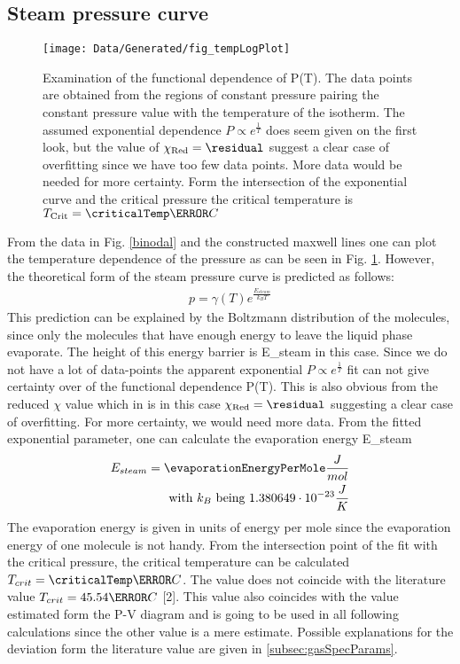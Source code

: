 \documentclass[a4paper,10pt,twocolumn]{article}
\begin{document}
    \subsection{Steam pressure curve}\label{subsec:steamPressureCurve}
    \begin{figure}
        \begin{center}
            \texttt{[image: Data/Generated/fig\_tempLogPlot]}
            \caption[]{Examination of the functional dependence of P(T). The data points are obtained from the regions of constant pressure pairing the constant pressure value with the temperature of the isotherm.
            The assumed exponential dependence $P \propto e^{\frac{1}{T}} $ does seem given on the first look, but the value of $\chi_{\text{Red}}=\residual$ suggest a clear case of overfitting since we have
            too few data points. More data would be needed for more certainty. Form the intersection of the exponential curve and the critical pressure the critical temperature is $T_{\text{Crit}}=\criticalTemp\degree C$}
            \label{fig:tempLogPLot}
        \end{center}
    \end{figure}
    From the data in Fig. \ref{binodal} and the constructed maxwell lines one can plot the temperature dependence of the pressure as can be seen in Fig. \ref{fig:tempLogPLot}.
    However, the theoretical form of the steam pressure curve is predicted as follows:
    \begin{align}
        p=\gamma(T)e^\frac{E_{steam}}{k_B T}
    \end{align}
    This prediction can be explained by the Boltzmann distribution of the molecules, since only the molecules that have enough energy to leave the liquid phase evaporate.
    The height of this energy barrier is E_{steam}\) in this case.
    Since we do not have a lot of data-points the apparent exponential $P \propto e^{\frac{1}{T}} $ fit can not give certainty over of the functional dependence P(T).
    This is also obvious from the reduced $\chi$ value which in is in this case $\chi_{\text{Red}}=\residual$ suggesting a clear case of overfitting.
    For more certainty, we would need more data.
    From the fitted exponential parameter, one can calculate the evaporation energy E_{steam}\)
    \begin{align}
        E_{steam} = \evaporationEnergyPerMole \frac{J}{mol}
        \endline \text{with } k_B \text{ being } 1.380649\cdot 10^{-23}\frac{J}{K}
    \end{align}
    The evaporation energy is given in units of energy per mole since the evaporation energy of one molecule is not handy. 
    From the intersection point of the fit with the critical pressure, the critical temperature can be calculated $T_{crit}=\criticalTemp\degree C $.
    The value does not coincide with the literature value $T_{crit} = 45.54\degree C$ [2].
    This value also coincides with the value estimated form the P-V diagram and is going to be used in all following calculations since the other value is a mere estimate.
    Possible explanations for the deviation form the literature value are given in \autoref{subsec:gasSpecParams}.
    
\end{document}

